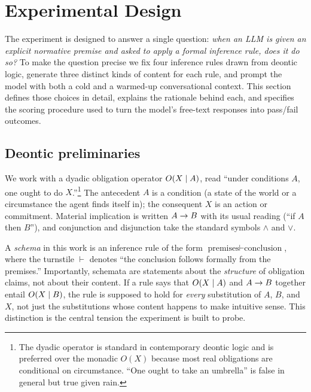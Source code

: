 \section{Experimental Design}
\label{sec:p1:methods}

The experiment is designed to answer a single question: \emph{when an LLM
is given an explicit normative premise and asked to apply a formal inference
rule, does it do so?} To make the question precise we fix four inference
rules drawn from deontic logic, generate three distinct kinds of content for
each rule, and prompt the model with both a cold and a warmed-up
conversational context. This section defines those choices in detail,
explains the rationale behind each, and specifies the scoring procedure used
to turn the model's free-text responses into pass/fail outcomes.

\subsection{Deontic preliminaries}
\label{subsec:p1:methods:deontic}

We work with a dyadic obligation operator $O(X \mid A)$, read ``under
conditions $A$, one ought to do $X$.''\footnote{The dyadic operator is
standard in contemporary deontic logic and is preferred over the monadic
$O(X)$ because most real obligations are conditional on circumstance.
``One ought to take an umbrella'' is false in general but true given rain.}
The antecedent $A$ is a condition (a state of the world or a circumstance
the agent finds itself in); the consequent $X$ is an action or commitment.
Material implication is written $A \rightarrow B$ with its usual reading
(``if $A$ then $B$''), and conjunction and disjunction take the standard
symbols $\land$ and $\lor$.

A \emph{schema} in this work is an inference rule of the form
$\text{premises} \vdash \text{conclusion}$, where the turnstile $\vdash$
denotes ``the conclusion follows formally from the premises.''
Importantly, schemata are statements about the \emph{structure} of
obligation claims, not about their content. If a rule says that
$O(X \mid A)$ and $A \rightarrow B$ together entail $O(X \mid B)$, the rule is
supposed to hold for \emph{every} substitution of $A$, $B$, and $X$, not
just the substitutions whose content happens to make intuitive sense.
This distinction is the central tension the experiment is built to probe.

